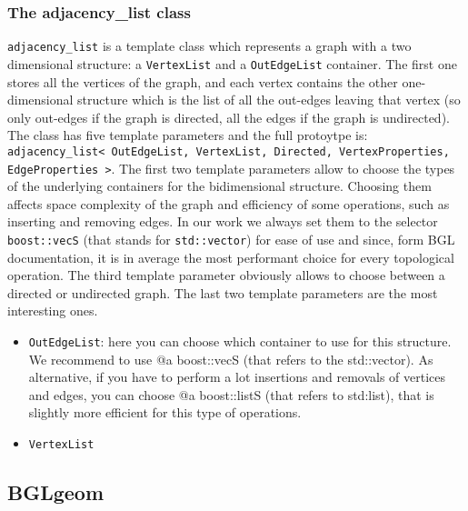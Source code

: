 \documentclass[11pt]{article} %
\newcommand{\classname}[1]{\texttt{#1}}
\begin{document}
		\subsubsection{The adjacency\_list class}
		\classname{adjacency\_list} is a template class which represents a graph with a two dimensional structure: 
		a \texttt{VertexList} and a \texttt{OutEdgeList} container. The first one stores all the vertices of the graph, and each vertex contains the other one-dimensional structure which is the list of all the out-edges leaving that vertex (so only out-edges if the graph is directed, all the edges if the graph is undirected). \newline
		The class has five template parameters and the full protoytpe is: \classname{adjacency\_list< OutEdgeList, VertexList, Directed, VertexProperties, EdgeProperties >}. \newline
		The first two template parameters allow to choose the types of the underlying containers for the bidimensional structure. Choosing them affects space complexity of the graph and efficiency of some operations, such as inserting and removing edges. In our work we always set them to the selector \classname{boost::vecS} (that stands for \texttt{std::vector}) for ease of use and since, form BGL documentation, it is in average the most performant choice for every topological operation. \newline
		The third template parameter obviously allows to choose between a directed or undirected graph.\newline
		The last two template parameters are the most interesting ones. 
		
		
		\begin{itemize}
			\item \texttt{OutEdgeList}: here you can choose which container to use for this 
			structure. We recommend to use @a boost::vecS (that refers to the 
			std::vector). As alternative, if you have to perform a lot insertions 
			and removals of vertices and edges, you can choose @a boost::listS 
			(that refers to std:list), that is slightly more efficient for this 
			type of operations.
			
			\item \texttt{VertexList} 
		\end{itemize}
		 
	
	\subsection{BGLgeom}
\end{document}
